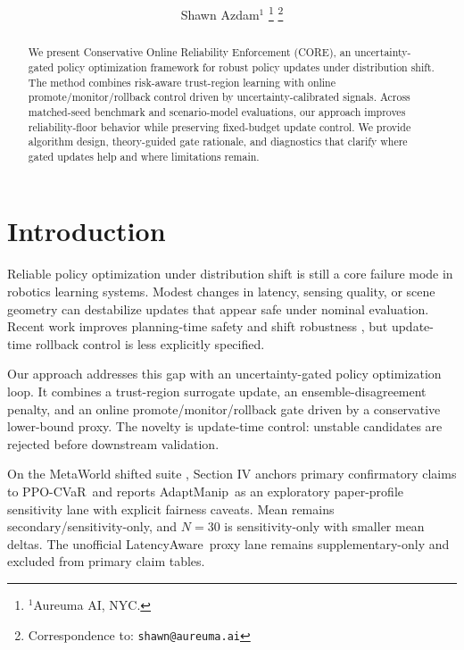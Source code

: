 \documentclass[letterpaper,10pt,conference]{ieeeconf}
\title{\LARGE \bf \CorePaperTitleText}
\author{
    Shawn Azdam$^{1}$%
    \thanks{$^{1}$Aureuma AI, NYC.}%
    \thanks{Correspondence to: \texttt{shawn@aureuma.ai}}
}
\newcommand{\CoreRefTwoLabel}{PPO-CVaR}
\newcommand{\CoreCompLatencyAware}{LatencyAware}
\newcommand{\CoreCompAdaptManip}{AdaptManip}
\begin{document}
\maketitle
\thispagestyle{empty}
\pagestyle{empty}

\begin{abstract}
We present Conservative Online Reliability Enforcement (CORE), an uncertainty-gated policy optimization framework for robust policy updates under distribution shift. The method combines risk-aware trust-region learning with online promote/monitor/rollback control driven by uncertainty-calibrated signals. Across matched-seed benchmark and scenario-model evaluations, our approach improves reliability-floor behavior while preserving fixed-budget update control. We provide algorithm design, theory-guided gate rationale, and diagnostics that clarify where gated updates help and where limitations remain.
\end{abstract}


\section{Introduction}

Reliable policy optimization under distribution shift is still a core failure mode in robotics learning systems. Modest changes in latency, sensing quality, or scene geometry can destabilize updates that appear safe under nominal evaluation. Recent work improves planning-time safety and shift robustness \cite{a2602_12047v1,a2602_12616v1,a2602_12032v1,a2602_09021v1}, but update-time rollback control is less explicitly specified.

Our approach addresses this gap with an uncertainty-gated policy optimization loop. It combines a trust-region surrogate update, an ensemble-disagreement penalty, and an online promote/monitor/rollback gate driven by a conservative lower-bound proxy. The novelty is update-time control: unstable candidates are rejected before downstream validation.

On the MetaWorld shifted suite \cite{yu2020metaworld}, Section IV anchors primary confirmatory claims to \CoreRefTwoLabel\ and reports \CoreCompAdaptManip\ as an exploratory paper-profile sensitivity lane with explicit fairness caveats. Mean remains secondary/sensitivity-only, and $N=30$ is sensitivity-only with smaller mean deltas. The unofficial \CoreCompLatencyAware\ proxy lane remains supplementary-only and excluded from primary claim tables.
\end{document}
